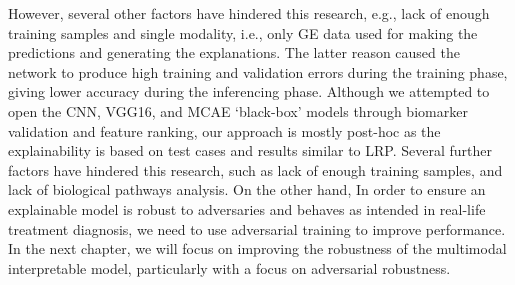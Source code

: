 \hspace*{3.5mm} However, several other factors have hindered this research, e.g., lack of enough training samples and single modality, i.e., only GE data used for making the predictions and generating the explanations. The latter reason caused the network to produce high training and validation errors during the training phase, giving lower accuracy during the inferencing phase. Although we attempted to open the CNN, VGG16, and MCAE `black-box' models through biomarker validation and feature ranking, our approach is mostly post-hoc as the explainability is based on test cases and results similar to LRP. 
Several further factors have hindered this research, such as lack of enough training samples, and lack of biological pathways analysis. On the other hand, In order to ensure an explainable model is robust to adversaries and behaves as intended in real-life treatment diagnosis, we need to use adversarial training to improve performance\cite{bhatt2020explainable}. In the next chapter, we will focus on improving the robustness of the multimodal interpretable model, particularly with a focus on adversarial robustness. 
